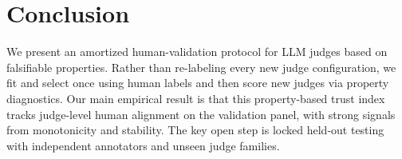 \documentclass{article}
\begin{document}
\section{Conclusion}
We present an amortized human-validation protocol for LLM judges based on falsifiable properties.
Rather than re-labeling every new judge configuration, we fit and select once using human labels and then score new judges via property diagnostics.
Our main empirical result is that this property-based trust index tracks judge-level human alignment on the validation panel, with strong signals from monotonicity and stability.
The key open step is locked held-out testing with independent annotators and unseen judge families.









\end{document}
